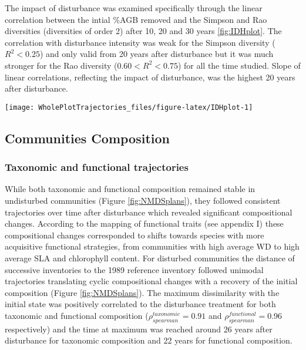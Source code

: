 \documentclass[fleqn,10pt]{ArtEcoFoG} %
\theoremstyle{definition}
\theoremstyle{definition}
\theoremstyle{definition}
\theoremstyle{remark}
\begin{document}
The impact of disturbance was examined specifically through the linear
correlation between the intial \%AGB removed and the Simpson and Rao
diversities (diversities of order 2) after 10, 20 and 30 years
\ref{fig:IDHplot}. The correlation with disturbance intensity was weak
for the Simpson diversity (\(R^2<0.25\)) and only valid from 20 years
after disturbance but it was much stronger for the Rao diversity
(\(0.60<R^2<0.75\)) for all the time studied. Slope of linear
correlations, reflecting the impact of disturbance, was the highest 20
years after disturbance.

\begin{figure*}

{\centering \texttt{[image: WholePlotTrajectories\_files/figure-latex/IDHplot-1]} 

}

\caption{Upper panels, Trajectories of the Simpson taxonomic diversity \textbf{(a)} and Rao functional diversity \textbf{(b)} over 30 years after disturbance. Colors are treatments: green (control), blue (T1), orange (T2), red (T3) with shaded areas the credibility intervals. Lower panels, Relationship between the initial \%AGB removed and Simpson \textbf{(c)} and Rao \textbf{(d)} diversities 10, 20 and 30 years after disturbance.}\label{fig:IDHplot}
\end{figure*}

\subsection{Communities Composition}\label{communities-composition}

\subsubsection{Taxonomic and functional
trajectories}\label{taxonomic-and-functional-trajectories}

While both taxonomic and functional composition remained stable in
undisturbed communities (Figure \ref{fig:NMDSplans}), they followed
consistent trajectories over time after disturbance which revealed
significant compositional changes. According to the mapping of
functional traits (see appendix I) these compositional changes
corresponded to shifts towards species with more acquisitive functional
strategies, from communities with high average WD to high average SLA
and chlorophyll content. For disturbed communities the distance of
successive inventories to the 1989 reference inventory followed unimodal
trajectories translating cyclic compositional changes with a recovery of
the initial composition (Figure \ref{fig:NMDSplans}). The maximum
dissimilarity with the initial state was positively correlated to the
disturbance treatment for both taxonomic and functional composition
(\(\rho_{spearman}^{taxonomic}=0.91\) and
\(\rho_{spearman}^{functional}=0.96\) respectively) and the time at
maximum was reached around 26 years after disturbance for taxonomic
composition and 22 years for functional composition.
\end{document}
